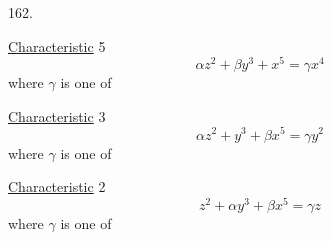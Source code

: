 162.

\uline{Characteristic} 5
\[
\alpha z^2+\beta y^3+x^5=\gamma x^4
\]
where $\gamma$ is one of

\uline{Characteristic} 3
\[
\alpha z^2+y^3+\beta x^5=\gamma y^2
\]
where $\gamma$ is one of

\uline{Characteristic} 2
\[
z^2+\alpha y^3+\beta x^5=\gamma z
\]
where $\gamma$ is one of
